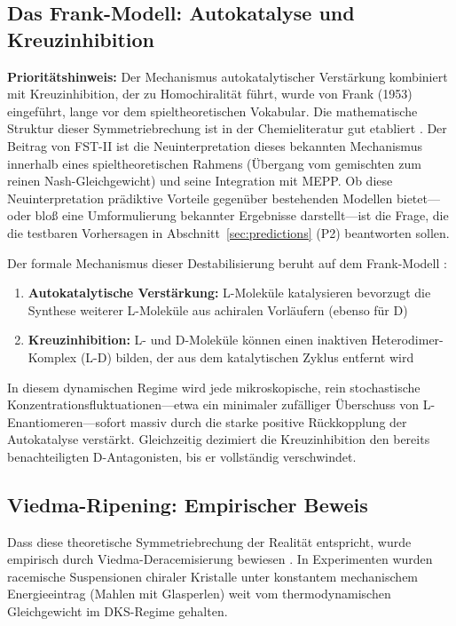 \documentclass[12pt,a4paper]{article}
\theoremstyle{remark}
\begin{document}
\subsection{Das Frank-Modell: Autokatalyse und Kreuzinhibition}

\textbf{Priorit\"atshinweis:} Der Mechanismus autokatalytischer Verst\"arkung kombiniert mit Kreuzinhibition, der zu Homochiralit\"at f\"uhrt, wurde von Frank (1953) \citep{Frank1953} eingef\"uhrt, lange vor dem spieltheoretischen Vokabular. Die mathematische Struktur dieser Symmetriebrechung ist in der Chemieliteratur gut etabliert \citep{SchmitzReview2011}. Der Beitrag von FST-II ist die Neuinterpretation dieses bekannten Mechanismus innerhalb eines spieltheoretischen Rahmens (\"Ubergang vom gemischten zum reinen Nash-Gleichgewicht) und seine Integration mit MEPP. Ob diese Neuinterpretation pr\"adiktive Vorteile gegen\"uber bestehenden Modellen bietet---oder blo\ss{} eine Umformulierung bekannter Ergebnisse darstellt---ist die Frage, die die testbaren Vorhersagen in Abschnitt~\ref{sec:predictions} (P2) beantworten sollen.

Der formale Mechanismus dieser Destabilisierung beruht auf dem Frank-Modell \citep{Frank1953}:
\begin{enumerate}
    \item \textbf{Autokatalytische Verst\"arkung:} L-Molek\"ule katalysieren bevorzugt die Synthese weiterer L-Molek\"ule aus achiralen Vorl\"aufern (ebenso f\"ur D)
    \item \textbf{Kreuzinhibition:} L- und D-Molek\"ule k\"onnen einen inaktiven Heterodimer-Komplex (L-D) bilden, der aus dem katalytischen Zyklus entfernt wird \citep{Biochirality}
\end{enumerate}

In diesem dynamischen Regime wird jede mikroskopische, rein stochastische Konzentrationsfluktuationen---etwa ein minimaler zuf\"alliger \"Uberschuss von L-Enantiomeren---sofort massiv durch die starke positive R\"uckkopplung der Autokatalyse verst\"arkt. Gleichzeitig dezimiert die Kreuzinhibition den bereits benachteiligten D-Antagonisten, bis er vollst\"andig verschwindet.

\subsection{Viedma-Ripening: Empirischer Beweis}

Dass diese theoretische Symmetriebrechung der Realit\"at entspricht, wurde empirisch durch Viedma-Deracemisierung bewiesen \citep{HomochiralityThermo}. In Experimenten wurden racemische Suspensionen chiraler Kristalle unter konstantem mechanischem Energieeintrag (Mahlen mit Glasperlen) weit vom thermodynamischen Gleichgewicht im DKS-Regime gehalten.
\end{document}
